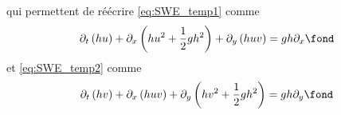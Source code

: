 qui permettent de réécrire \eqref{eq:SWE_temp1} comme
\begin{equation}
	\partial_t \left(hu\right) + \partial_x \left(hu^2 + \frac{1}{2}gh^2\right) + \partial_y \left(h u v\right) = gh \partial_x \fond
\end{equation}
et \eqref{eq:SWE_temp2} comme
\begin{equation}
\partial_t \left(hv\right) + \partial_x \left(h u v\right) + \partial_y \left(hv^2 + \frac{1}{2}gh^2\right) = g h \partial_y \fond
\end{equation}
